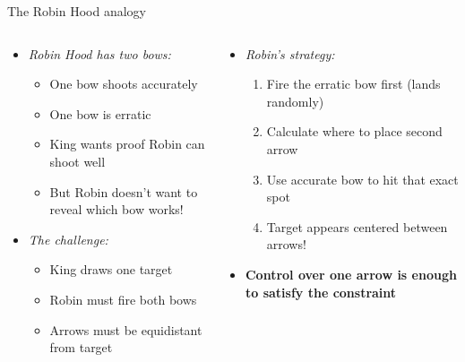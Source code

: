 \documentclass[aspectratio=169, lualatex, handout]{beamer}
\begin{document}
\begin{frame}{The Robin Hood analogy}
	\begin{columns}[c]
		\begin{column}{0.5\textwidth}
			\begin{itemize}
				\item \textit{Robin Hood has two bows:}
				      \begin{itemize}
					      \item One bow shoots accurately
					      \item One bow is erratic
					      \item King wants proof Robin can shoot well
					      \item But Robin doesn't want to reveal which bow works!
				      \end{itemize}
			\end{itemize}
			\begin{itemize}
				\item \textit{The challenge:}
				      \begin{itemize}
					      \item King draws one target
					      \item Robin must fire both bows
					      \item Arrows must be equidistant from target
				      \end{itemize}
			\end{itemize}
		\end{column}
		\begin{column}{0.5\textwidth}
			\begin{itemize}
				\item \textit{Robin's strategy:}
				      \begin{enumerate}
					      \item Fire the erratic bow first (lands randomly)
					      \item Calculate where to place second arrow
					      \item Use accurate bow to hit that exact spot
					      \item Target appears centered between arrows!
				      \end{enumerate}
				\item \textbf{Control over one arrow is enough to satisfy the constraint}
			\end{itemize}
		\end{column}
	\end{columns}
\end{frame}
\end{document}

